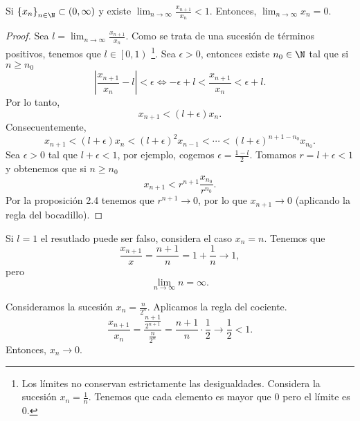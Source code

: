 \begin{ftheorem}
	\normalfont Si $\displaystyle \left\{ x_{n}\right\} _{n\in\N} \subset \left(0 , \infty\right)$ y existe $\displaystyle \lim_{n \to \infty} \frac{x_{n+1}}{x_{n}} < 1 $. Entonces, $\displaystyle \lim_{n \to \infty} x_{n} = 0  $. 
\end{ftheorem}

\begin{proof}
Sea $\displaystyle l = \lim_{n \to \infty}\frac{x_{n+1}}{x_{n}} $. Como se trata de una sucesión de términos positivos, tenemos que $\displaystyle l \in \left[0,1\right) $ \footnote{Los límites no conservan estrictamente las desigualdades. Considera la sucesión $\displaystyle x_{n} = \frac{1}{n} $. Tenemos que cada elemento es mayor que 0 pero el límite es 0.}. Sea $\displaystyle \epsilon > 0 $, entonces existe $\displaystyle n_{0}\in\N $ tal que si $\displaystyle n \geq n_{0} $ 
\[ \left|\frac{x_{n+1}}{x_{n}}-l\right| < \epsilon \iff -\epsilon + l< \frac{x_{n+1}}{x_{n}} < \epsilon + l .\]
Por lo tanto, 
\[x_{n+1} < \left(l + \epsilon \right)x_{n} .\]
Consecuentemente, 
\[ x_{n+1} < \left(l + \epsilon \right)x_{n} < \left(l+\epsilon \right)^{2}x_{n-1} < \cdots < \left(l+\epsilon \right)^{n+1-n_{0}}x_{n_{0}}.\]
Sea $\displaystyle \epsilon > 0 $ tal que $\displaystyle l + \epsilon < 1 $, por ejemplo, cogemos $\displaystyle \epsilon = \frac{1 - l}{2}$. Tomamos $\displaystyle r = l + \epsilon < 1 $ y obtenemos que si $\displaystyle n \geq n_{0} $ 
\[ x_{n+1} < r^{n+1}\frac{x_{n_{0}}}{r^{n_{0}}} .\]
Por la proposición 2.4 tenemos que $\displaystyle r^{n+1} \to 0 $, por lo que $\displaystyle x_{n+1} \to 0 $ (aplicando la regla del bocadillo).
\end{proof}

\begin{observation}
\normalfont Si $\displaystyle l = 1 $ el resutlado puede ser falso, considera el caso $\displaystyle x_{n} = n $. Tenemos que
\[\frac{x_{n+1}}{x}=\frac{n+1}{n} = 1 + \frac{1}{n} \to 1 , \]
pero 
\[ \lim_{n \to \infty} n = \infty .\]
\end{observation}

\begin{eg}
\normalfont Consideramos la sucesión $\displaystyle x_{n} = \frac{n}{2^{n}} $. Aplicamos la regla del cociente. 
\[ \frac{x_{n+1}}{x_{n}} = \frac{\frac{n+1}{2^{n+1}}}{\frac{n}{2^{n}}} = \frac{n+1}{n} \cdot \frac{1}{2} \to \frac{1}{2} < 1 .\]
Entonces, $\displaystyle x_{n} \to 0 $.
\end{eg}

